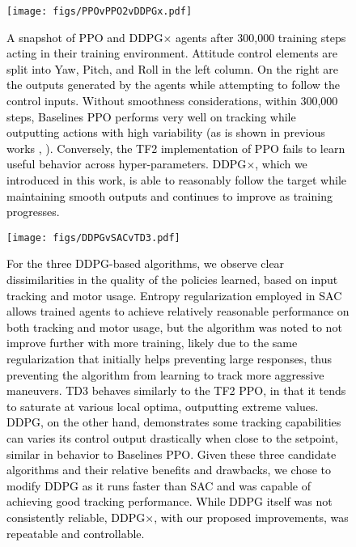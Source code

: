 \documentclass[letterpaper, 10 pt, conference]{ieeeconf} %
\newcommand{\rev}[1]{\textcolor{black}{#1}}
\begin{document}
    \begin{figure}[t]
        \centering
        \texttt{[image: figs/PPOvPPO2vDDPGx.pdf]}
        \caption{
            \rev{
            A snapshot of PPO and DDPG$\times$ agents after 300,000 training steps acting in their training environment.
            Attitude control elements are split into Yaw, Pitch, and Roll in the left column.
            On the right are the outputs generated by the agents while attempting to follow the control inputs.
            Without smoothness considerations, within 300,000 steps, Baselines PPO performs very well on tracking while outputting actions with high variability (as is shown in previous works \cite{mysore2021caps}, \cite{mysore2021train}).
            Conversely, the TF2 implementation of PPO fails to learn useful behavior across hyper-parameters.
            DDPG$\times$, which we introduced in this work, is able to reasonably follow the target while maintaining smooth outputs and continues to improve as training progresses.
            }
        }
        \label{fig:ppovppo2vddpgx}
        \vspace{-1.5\baselineskip}
    \end{figure}
    
    
    
    \begin{figure}[t]
        \centering
        \texttt{[image: figs/DDPGvSACvTD3.pdf]}
        \caption{
            \rev{
                For the three DDPG-based algorithms, we observe clear dissimilarities in the quality of the policies learned, based on input tracking and motor usage.
                Entropy regularization employed in SAC allows trained agents to achieve relatively reasonable performance on both tracking and motor usage, but the algorithm was noted to not improve further with more training, likely due to the same regularization that initially helps preventing large responses, thus preventing the algorithm from learning to track more aggressive maneuvers.
                TD3 behaves similarly to the TF2 PPO, in that it tends to saturate at various local optima, outputting extreme values.
                DDPG, on the other hand, demonstrates some tracking capabilities can varies its control output drastically when close to the setpoint, similar in behavior to Baselines PPO. 
                Given these three candidate algorithms and their relative benefits and drawbacks, we chose to modify DDPG as it runs faster than SAC and was capable of achieving good tracking performance.
                While DDPG itself was not consistently reliable, DDPG$\times$, with our proposed improvements, was repeatable and controllable.
            }
        }
        \label{fig:ddpgvsacvtd3}
        \vspace{-1.5\baselineskip}
    \end{figure}
\end{document}
